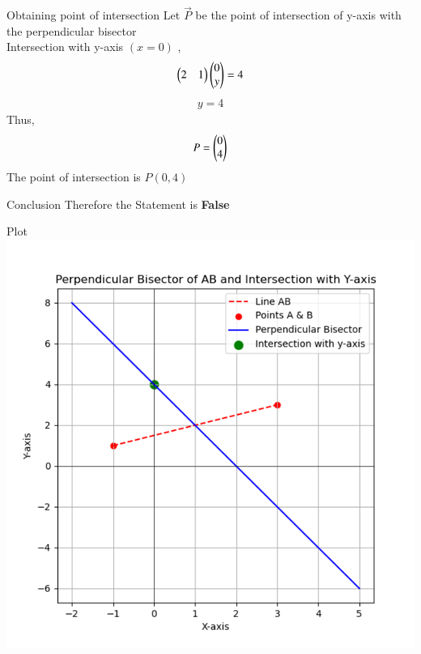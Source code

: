 \documentclass{beamer}
\begin{document}
\begin{frame}{Obtaining point of intersection}
Let $\vec{P}$ be the point of intersection of y-axis with the perpendicular bisector \\
Intersection with y-axis $(x=0)$ ,
\begin{align}
    \begin{pmatrix}2&1\end{pmatrix}\begin{pmatrix}0\\y\end{pmatrix}=4
\end{align}
\begin{align}
	y=4
\end{align}
Thus,
\begin{align}
	P=\begin{pmatrix}0\\4\end{pmatrix}
\end{align}
The point of intersection is $P(0,4)$ \\
\end{frame}
\begin{frame}{Conclusion}
Therefore the Statement is \textbf{False}
\end{frame}
\begin{frame}{Plot}
    \centering
    \includegraphics[width=3\columnwidth, height=0.8\textheight, keepaspectratio]{figs/fig.png}     
\end{frame}
\end{document}
